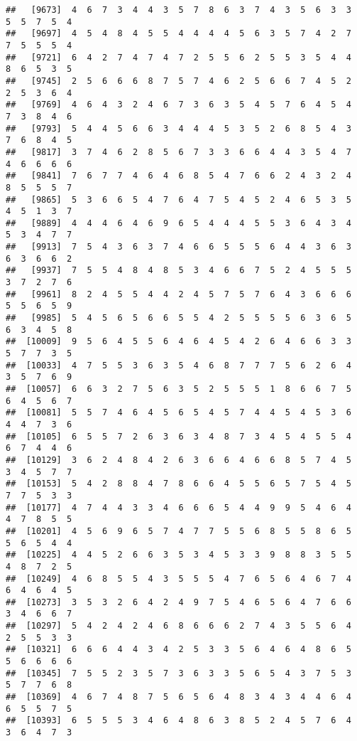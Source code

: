 \documentclass[
]{book}
\begin{document}
\begin{verbatim}
##   [9673]  4  6  7  3  4  4  3  5  7  8  6  3  7  4  3  5  6  3  3  5  5  7  5  4
##   [9697]  4  5  4  8  4  5  5  4  4  4  4  5  6  3  5  7  4  2  7  7  5  5  5  4
##   [9721]  6  4  2  7  4  7  4  7  2  5  5  6  2  5  5  3  5  4  4  8  6  5  3  5
##   [9745]  2  5  6  6  6  8  7  5  7  4  6  2  5  6  6  7  4  5  2  2  5  3  6  4
##   [9769]  4  6  4  3  2  4  6  7  3  6  3  5  4  5  7  6  4  5  4  7  3  8  4  6
##   [9793]  5  4  4  5  6  6  3  4  4  4  5  3  5  2  6  8  5  4  3  7  6  8  4  5
##   [9817]  3  7  4  6  2  8  5  6  7  3  3  6  6  4  4  3  5  4  7  4  6  6  6  6
##   [9841]  7  6  7  7  4  6  4  6  8  5  4  7  6  6  2  4  3  2  4  8  5  5  5  7
##   [9865]  5  3  6  6  5  4  7  6  4  7  5  4  5  2  4  6  5  3  5  4  5  1  3  7
##   [9889]  4  4  4  6  4  6  9  6  5  4  4  4  5  5  3  6  4  3  4  5  3  4  7  7
##   [9913]  7  5  4  3  6  3  7  4  6  6  5  5  5  6  4  4  3  6  3  6  3  6  6  2
##   [9937]  7  5  5  4  8  4  8  5  3  4  6  6  7  5  2  4  5  5  5  3  7  2  7  6
##   [9961]  8  2  4  5  5  4  4  2  4  5  7  5  7  6  4  3  6  6  6  5  5  6  5  9
##   [9985]  5  4  5  6  5  6  6  5  5  4  2  5  5  5  5  6  3  6  5  6  3  4  5  8
##  [10009]  9  5  6  4  5  5  6  4  6  4  5  4  2  6  4  6  6  3  3  5  7  7  3  5
##  [10033]  4  7  5  5  3  6  3  5  4  6  8  7  7  7  5  6  2  6  4  3  5  7  6  9
##  [10057]  6  6  3  2  7  5  6  3  5  2  5  5  5  1  8  6  6  7  5  6  4  5  6  7
##  [10081]  5  5  7  4  6  4  5  6  5  4  5  7  4  4  5  4  5  3  6  4  4  7  3  6
##  [10105]  6  5  5  7  2  6  3  6  3  4  8  7  3  4  5  4  5  5  4  6  7  4  4  6
##  [10129]  3  6  2  4  8  4  2  6  3  6  6  4  6  6  8  5  7  4  5  3  4  5  7  7
##  [10153]  5  4  2  8  8  4  7  8  6  6  4  5  5  6  5  7  5  4  5  7  7  5  3  3
##  [10177]  4  7  4  4  3  3  4  6  6  6  5  4  4  9  9  5  4  6  4  4  7  8  5  5
##  [10201]  4  5  6  9  6  5  7  4  7  7  5  5  6  8  5  5  8  6  5  5  6  5  4  4
##  [10225]  4  4  5  2  6  6  3  5  3  4  5  3  3  9  8  8  3  5  5  4  8  7  2  5
##  [10249]  4  6  8  5  5  4  3  5  5  5  4  7  6  5  6  4  6  7  4  6  4  6  4  5
##  [10273]  3  5  3  2  6  4  2  4  9  7  5  4  6  5  6  4  7  6  6  3  4  6  6  7
##  [10297]  5  4  2  4  2  4  6  8  6  6  6  2  7  4  3  5  5  6  4  2  5  5  3  3
##  [10321]  6  6  6  4  4  3  4  2  5  3  3  5  6  4  6  4  8  6  5  5  6  6  6  6
##  [10345]  7  5  5  2  3  5  7  3  6  3  3  5  6  5  4  3  7  5  3  5  7  7  6  8
##  [10369]  4  6  7  4  8  7  5  6  5  6  4  8  3  4  3  4  4  6  4  6  5  5  7  5
##  [10393]  6  5  5  5  3  4  6  4  8  6  3  8  5  2  4  5  7  6  4  3  6  4  7  3

\end{verbatim}
\end{document}
